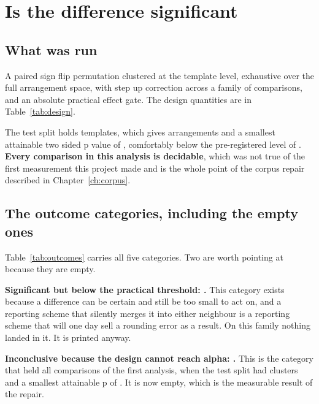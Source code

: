 \chapter{Is the difference significant}
\label{ch:statistics}

\section{What was run}

A paired sign flip permutation clustered at the template level, exhaustive over
the full arrangement space, with step up correction across a family of
\vFamilySize{} comparisons, and an absolute practical effect gate. The design
quantities are in Table~\ref{tab:design}.

The test split holds \vTestTemplates{} templates, which gives \vArrangements{}
arrangements and a smallest attainable two sided p value of \vMinAttainableP{},
comfortably below the pre-registered level of \vAlpha{}. \textbf{Every
comparison in this analysis is decidable}, which was not true of the first
measurement this project made and is the whole point of the corpus repair
described in Chapter~\ref{ch:corpus}.

\section{The outcome categories, including the empty ones}

\begin{table}[htbp]
  \centering
  \caption{Every verdict category in the family of comparisons, including the
  two that came back empty. A summary listing only the categories that occurred
  would drop them on exactly the runs where nothing landed in them.}
  \label{tab:outcomes}
  
\end{table}

Table~\ref{tab:outcomes} carries all five categories. Two are worth pointing at
because they are empty.

\textbf{Significant but below the practical threshold: \vBelowThreshold{}.} This
category exists because a difference can be certain and still be too small to
act on, and a reporting scheme that silently merges it into either neighbour is
a reporting scheme that will one day sell a rounding error as a result. On this
family nothing landed in it. It is printed anyway.

\textbf{Inconclusive because the design cannot reach alpha: \vUnderpowered{}.}
This is the category that held all \vOldFamilySize{} comparisons of the first
analysis, when the test split had \vOldClusters{} clusters and a smallest
attainable p of \vOldMinAttainableP{}. It is now empty, which is the measurable
result of the repair.

